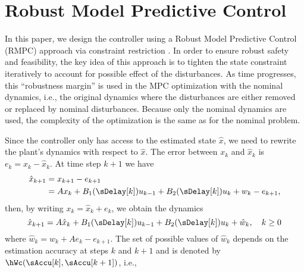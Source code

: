 \section{Robust Model Predictive Control}
\label{sec:rmpcapx}
In this paper, we design the controller using a Robust Model Predictive
Control (RMPC) approach via constraint restriction \cite{richardsetal05rmp, chiscietal01swp}.
In order to ensure robust safety and feasibility, the key idea of
this approach is to tighten the state constraint iteratively to account
for possible effect of the disturbances. As time progresses, this ``robustness
margin'' is used in the MPC optimization with the nominal dynamics,
i.e., the original dynamics where the disturbances are either removed
or replaced by nominal disturbances.
Because only the nominal dynamics are used, the complexity of the optimization is the same as for the nominal problem.

Since the controller only has access to the estimated state $\hat{x}$, we need
to rewrite the plant's dynamics with respect to $\hat{x}$. The error
between $ $$x_{k}$ and $\hat{x}_{k}$ is $e_{k}=x_{k}-\hat{x}_{k}$.
At time step $k+1$ we have
\begin{align*}
\hat{x}_{k+1} & =x_{k+1}-e_{k+1}\\
& =Ax_{k}+B_{1}(\sDelay[k])u_{k-1}+B_{2}(\sDelay[k])u_{k}+w_{k}-e_{k+1}\text{,}
\end{align*}
then, by writing $x_{k}=\hat{x}_{k}+e_{k}$, we obtain the dynamics
\begin{equation}
\hat{x}_{k+1}=A\hat{x}_{k}+B_{1}(\sDelay[k])u_{k-1}+B_{2}(\sDelay[k])u_{k}+\hat{w}_{k},\quad k\geq0\label{eq:estimator-dynamics}
\end{equation}
where $\hat{w}_{k}=w_{k}+Ae_{k}-e_{k+1}$.
The set of possible values of $\hat{w}_{k}$
depends on the estimation accuracy at steps $k$ and $k+1$ and is
denoted by $\hWc(\sAccu[k],\sAccu[k+1])$, i.e.,

